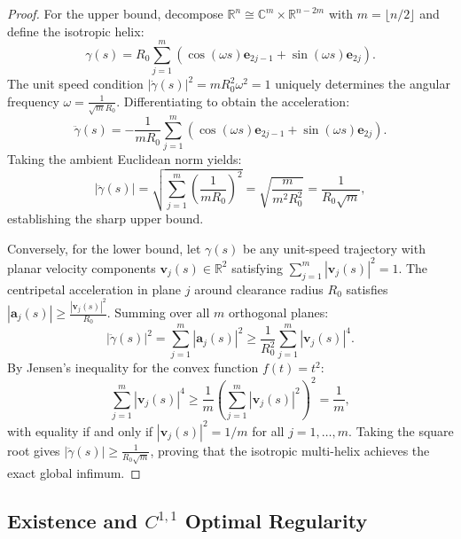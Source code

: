 \documentclass[11pt,reqno]{amsart}
\theoremstyle{definition}
\providecommand{\R}{\mathbb{R}}
\newcommand{\C}{\mathbb{C}}
\numberwithin{equation}{section}
\providecommand{\R}{\mathbb{R}}
\begin{document}
\begin{proof}
For the upper bound, decompose $\R^n \cong \C^{m} \times \R^{n-2m}$ with $m = \lfloor n/2 \rfloor$ and define the isotropic helix:
\begin{equation}
\gamma(s) = R_0 \sum_{j=1}^m \left( \cos(\omega s) \mathbf{e}_{2j-1} + \sin(\omega s) \mathbf{e}_{2j} \right).
\end{equation}
The unit speed condition $|\dot{\gamma}(s)|^2 = m R_0^2 \omega^2 = 1$ uniquely determines the angular frequency $\omega = \frac{1}{\sqrt{m} R_0}$. Differentiating to obtain the acceleration:
\begin{equation}
\ddot{\gamma}(s) = -\frac{1}{m R_0} \sum_{j=1}^m \left( \cos(\omega s) \mathbf{e}_{2j-1} + \sin(\omega s) \mathbf{e}_{2j} \right).
\end{equation}
Taking the ambient Euclidean norm yields:
\begin{equation}
|\ddot{\gamma}(s)| = \sqrt{\sum_{j=1}^m \left(\frac{1}{m R_0}\right)^2} = \sqrt{\frac{m}{m^2 R_0^2}} = \frac{1}{R_0 \sqrt{m}},
\end{equation}
establishing the sharp upper bound.

Conversely, for the lower bound, let $\gamma(s)$ be any unit-speed trajectory with planar velocity components $\mathbf{v}_j(s) \in \R^2$ satisfying $\sum_{j=1}^m |\mathbf{v}_j(s)|^2 = 1$. The centripetal acceleration in plane $j$ around clearance radius $R_0$ satisfies $|\mathbf{a}_j(s)| \ge \frac{|\mathbf{v}_j(s)|^2}{R_0}$. Summing over all $m$ orthogonal planes:
\begin{equation}
|\ddot{\gamma}(s)|^2 = \sum_{j=1}^m |\mathbf{a}_j(s)|^2 \ge \frac{1}{R_0^2} \sum_{j=1}^m |\mathbf{v}_j(s)|^4.
\end{equation}
By Jensen's inequality for the convex function $f(t) = t^2$:
\begin{equation}
\sum_{j=1}^m |\mathbf{v}_j(s)|^4 \ge \frac{1}{m} \left( \sum_{j=1}^m |\mathbf{v}_j(s)|^2 \right)^2 = \frac{1}{m},
\end{equation}
with equality if and only if $|\mathbf{v}_j(s)|^2 = 1/m$ for all $j=1,\dots,m$. Taking the square root gives $|\ddot{\gamma}(s)| \ge \frac{1}{R_0 \sqrt{m}}$, proving that the isotropic multi-helix achieves the exact global infimum.
\end{proof}

\subsection{Existence and \texorpdfstring{$C^{1,1}$}{C\textasciicircum(1,1)} Optimal Regularity}
\end{document}
